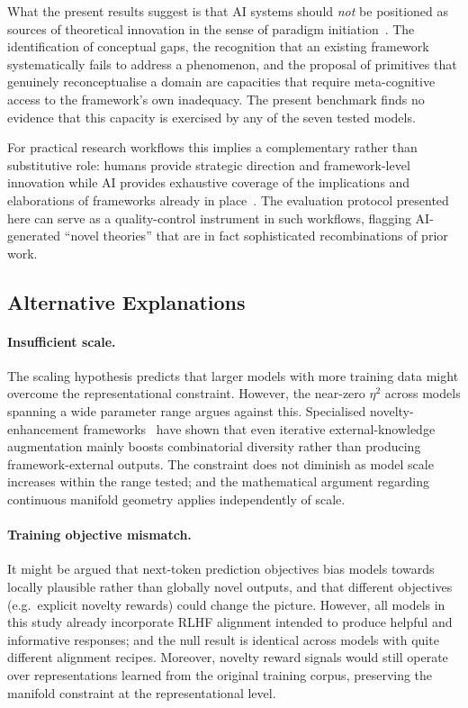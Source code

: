 \documentclass[pdflatex,sn-mathphys-num]{sn-jnl}
\begin{document}
What the present results suggest is that AI systems should \emph{not} be
positioned as sources of theoretical innovation in the sense of paradigm
initiation~\cite{kuhn1962structure}.  The identification of conceptual gaps,
the recognition that an existing framework systematically fails to address a
phenomenon, and the proposal of primitives that genuinely reconceptualise a
domain are capacities that require meta-cognitive access to the framework's own
inadequacy.  The present benchmark finds no evidence that this capacity is
exercised by any of the seven tested models.

For practical research workflows this implies a complementary rather than
substitutive role: humans provide strategic direction and framework-level
innovation while AI provides exhaustive coverage of the implications and
elaborations of frameworks already in place~\cite{zhang2025advancing}.  The evaluation protocol presented
here can serve as a quality-control instrument in such workflows, flagging
AI-generated ``novel theories'' that are in fact sophisticated recombinations of
prior work.

\subsection{Alternative Explanations}

\paragraph{Insufficient scale.}
The scaling hypothesis predicts that larger models with more training data
might overcome the representational constraint.  However, the near-zero
$\eta^2$ across models spanning a wide parameter range argues against this.
Specialised novelty-enhancement frameworks~\cite{hu2024nova,zhang2026innogym} have
shown that even iterative external-knowledge augmentation mainly boosts
combinatorial diversity rather than producing framework-external outputs.
The constraint does not diminish as model scale increases within the range
tested; and the mathematical argument regarding continuous manifold geometry
applies independently of scale.

\paragraph{Training objective mismatch.}
It might be argued that next-token prediction objectives bias models towards
locally plausible rather than globally novel outputs, and that different
objectives (e.g.\ explicit novelty rewards) could change the picture.
However, all models in this study already incorporate RLHF alignment intended
to produce helpful and informative responses; and the null result is identical
across models with quite different alignment recipes.  Moreover, novelty reward
signals would still operate over representations learned from the original
training corpus, preserving the manifold constraint at the representational
level.
\end{document}
